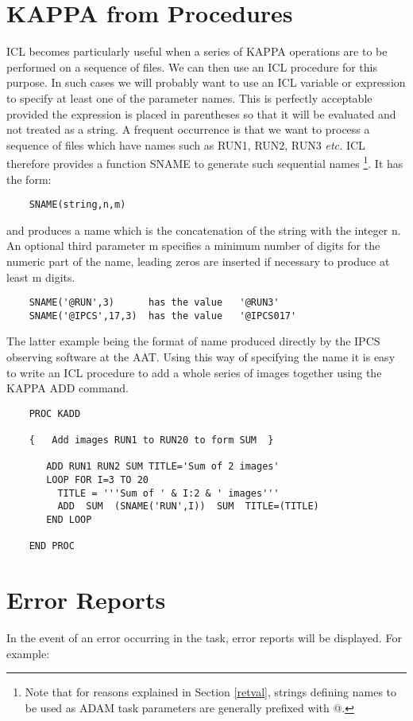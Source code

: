 \documentclass[twoside,11pt]{report}
\newcommand{\xlabel}[1]{}
\begin{document}
\section{\xlabel{kappa_from_procedures}KAPPA from Procedures}

ICL becomes particularly useful when a series of KAPPA operations are to
be performed on a sequence of files. We can then use an ICL procedure for
this purpose. In such cases we will probably want to use an ICL variable
or expression to specify at least one of the parameter names. This is
perfectly acceptable provided the expression is placed in parentheses so
that it will be evaluated and not treated as a string. A frequent occurrence
is that we want to process a sequence of files which have names such as
RUN1, RUN2, RUN3 {\em etc.} ICL therefore provides a function SNAME to generate
such sequential names
\footnote{Note that for reasons explained in Section \ref{retval}, strings
defining names to be used as ADAM task parameters are generally prefixed with
@.}.
It has the form:
\begin{verbatim}
    SNAME(string,n,m)
\end{verbatim}

and produces a name which is the concatenation of the string with the integer
n. An optional third parameter m specifies a minimum number of digits for
the numeric part of the name, leading zeros are inserted if necessary to
produce at least m digits.
\begin{verbatim}
    SNAME('@RUN',3)      has the value   '@RUN3'                        
    SNAME('@IPCS',17,3)  has the value   '@IPCS017'
\end{verbatim}
The latter example being the format of name produced directly by the IPCS
observing software at the AAT. Using this way of specifying the name it
is easy to write an ICL procedure to add a whole series of images together
using the KAPPA ADD command.

\begin{verbatim}
    PROC KADD
       
    {   Add images RUN1 to RUN20 to form SUM  }

       ADD RUN1 RUN2 SUM TITLE='Sum of 2 images'
       LOOP FOR I=3 TO 20
         TITLE = '''Sum of ' & I:2 & ' images'''
         ADD  SUM  (SNAME('RUN',I))  SUM  TITLE=(TITLE)
       END LOOP

    END PROC
\end{verbatim}

\section{\xlabel{error_reports}Error Reports}
In the event of an error occurring in the task, error reports will be
displayed. For example:
\end{document}
